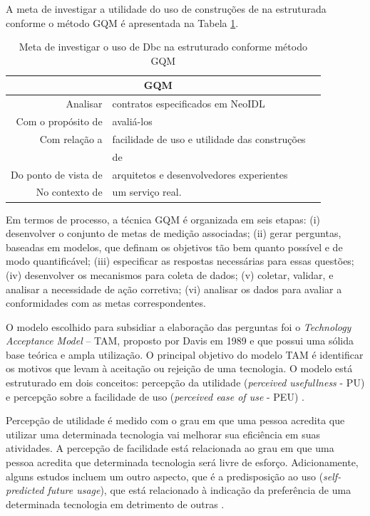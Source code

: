 A meta de investigar a utilidade do uso de construções de \designbycontract{} na
\neoidl{} estruturada conforme o método GQM é apresentada na Tabela
\ref{TabelaMetasGQM}.

\begin{table}[h]
\centering
\vspace{0.5cm}
\begin{tabular}{r|lr}
\multicolumn{2}{c}{GQM}\\
\hline    
Analisar & contratos especificados em NeoIDL \\
Com o propósito de  & avaliá-los \\
Com relação a & facilidade de uso e utilidade das construções \\
& de \designbycontract{} \\
Do ponto de vista de & arquitetos e desenvolvedores experientes \\
No contexto de & um serviço real.           
\end{tabular}
\caption{Meta de investigar o uso de Dbc na \neoidl{} estruturado conforme
método GQM}
\label{TabelaMetasGQM}
\end{table}

Em termos de processo, a técnica GQM é organizada em seis etapas: (i)
desenvolver o conjunto de metas de medição associadas; (ii) gerar perguntas,
baseadas em modelos, que definam os objetivos tão bem quanto possível e de modo
quantificável; (iii) especificar as respostas necessárias para essas questões;
(iv) desenvolver os mecanismos para coleta de dados; (v) coletar, validar, e analisar a necessidade de ação corretiva; (vi) analisar
os dados para avaliar a conformidades com as metas correspondentes.

O modelo escolhido para subsidiar a elaboração das perguntas foi o
\textit{Technology Acceptance Model} -- TAM, proposto por Davis em 1989
\cite{davis1989perceived} e que possui uma sólida base teórica e ampla
utilização.
O principal objetivo do modelo TAM é identificar os motivos que levam à aceitação
ou rejeição de uma tecnologia. O modelo está estruturado em dois conceitos:
percepção da utilidade (\textit{perceived usefullness} - PU) e percepção sobre a
facilidade de uso (\textit{perceived ease of use} - PEU)
\cite{hernandes2010avaliaccao}.

Percepção de utilidade é medido com o grau em que uma pessoa acredita que
utilizar uma determinada tecnologia vai melhorar sua eficiência em suas
atividades. A percepção de facilidade está relacionada ao grau em que uma pessoa
acredita que determinada tecnologia será livre de esforço. Adicionamente, alguns
estudos incluem um outro aspecto, que é a predisposição ao uso
(\textit{self-predicted future usage}), que está relacionado à indicação da 
preferência de uma determinada tecnologia em detrimento de outras \cite{laitenberger1998evaluating}.

